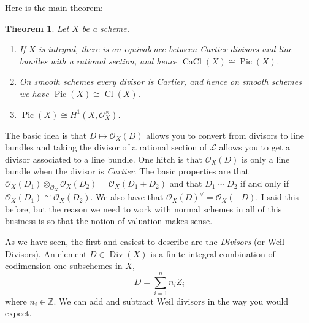 \documentclass[12pt]{article}
\numberwithin{equation}{section}
\newtheorem{theorem}{Theorem}[subsection]
\theoremstyle{definition}
\theoremstyle{remark}
\newcommand{\Ocal}{\mathcal{O}}
\newcommand{\Div}{\operatorname{Div}}
\newcommand{\CaCl}{\operatorname{CaCl}}
\newcommand{\Pic}{\operatorname{Pic}}
\newcommand{\Cl}{\operatorname{Cl}}
\newcommand{\Lcal}{\mathcal{L}}
\begin{document}
Here is the main theorem:
\begin{theorem}
	Let $X$ be a scheme. 
	\begin{enumerate}
	\item If $X$ is integral, there is an equivalence between Cartier divisors and line bundles with a rational section, and hence $\CaCl(X) \cong \Pic(X)$.
	\item On smooth schemes every divisor is Cartier, and hence on smooth schemes we have $\Pic(X) \cong \Cl(X)$.
	\item $\Pic(X) \cong H^1(X,\Ocal_X^{\times})$. 
	\end{enumerate}
\end{theorem}

The basic idea is that $D \mapsto \Ocal_X(D)$ allows you to convert from divisors to line bundles and taking the divisor of a rational section of $\Lcal$ allows you to get a divisor associated to a line bundle.
One hitch is that $\Ocal_X(D)$ is only a line bundle when the divisor is \emph{Cartier}.
The basic properties are that $\Ocal_X(D_1) \otimes_{\Ocal_X} \Ocal_X(D_2) = \Ocal_X(D_1+D_2)$ and that $D_1\sim D_2$ if and only if $\Ocal_X(D_1) \cong \Ocal_X(D_2)$. 
We also have that $\Ocal_X(D)^{\vee} = \Ocal_X(-D)$.
I said this before, but the reason we need to work with normal schemes in all of this business is so that the notion of valuation makes sense.

As we have seen, the first and easiest to describe are the \emph{Divisors} (or Weil Divisors). An element $D\in \Div(X)$ is a finite integral combination of codimension one subschemes in $X$,
$$ D = \sum_{i=1}^n n_i Z_i $$
where $n_i\in\mathbb Z$. We can add and subtract Weil divisors in the way you would expect.
\end{document}
